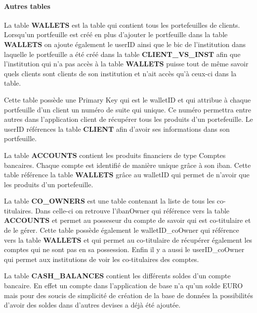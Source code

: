 \documentclass[../rapport.tex]{subfiles}
\begin{document}
	\bigskip

	\paragraph{Autres tables}

	La table \textbf{WALLETS} est la table qui contient tous les portefeuilles de 
	clients. Lorsqu'un portfeuille est créé en plus d'ajouter le portfeuille dans 
	la table \textbf{WALLETS} on ajoute également le userID ainsi que le bic de 
	l'institution dans laquelle le portfeuille a été créé dans la table
	\textbf{CLIENT\_VS\_INST} afin que l'institution qui n'a pas accès à la table 
	\textbf{WALLETS} puisse tout de même savoir quels clients sont clients de son
	institution et n'ait accès qu'à ceux-ci dans la table.
		
	\medskip

	Cette table possède une Primary Key qui est le walletID et qui attribue à chaque
	portfeuille d'un client un numéro de suite qui unique. Ce numéro permettra entre
	autres dans l'application client de récupérer tous les produits d'un 
	portefeuille. Le userID références la table \textbf{CLIENT} afin d'avoir ses
	informations dans son portfeuille.
	\bigskip

	La table \textbf{ACCOUNTS} contient les produits financiers de type Comptes 
	bancaires. Chaque compte est identifié de manière unique grâce à son iban.
	Cette table référence la table \textbf{WALLETS} grâce au walletID qui permet 
	de n'avoir que les produits d'un portefeuille. 

	\bigskip

	La table \textbf{CO\_OWNERS} est une table contenant la liste de tous les 
			co-titulaires. Dans celle-ci on retrouve l'ibanOwner qui référence vers
			la table \textbf{ACCOUNTS} et permet au posseseur du compte de savoir
			qui est co-titulaire et de le gérer. Cette table possède également le
			walletID\_coOwner qui référence vers la table \textbf{WALLETS} et qui 
			permet au co-titulaire de récupérer également les comptes qui ne sont
			pas en sa possession. Enfin il y a aussi le userID\_coOwner qui permet 
			aux institutions de voir les co-titulaires des comptes.

		\bigskip 
		
	La table \textbf{CASH\_BALANCES} contient les différents soldes d'un compte
	bancaire. En effet un compte dans l'application de base n'a qu'un solde EURO
	mais pour des soucis de simplicité de création de la base de données la 
	possibilités d'avoir des soldes dans d'autres devises a déjà été ajoutée.
\end{document}
